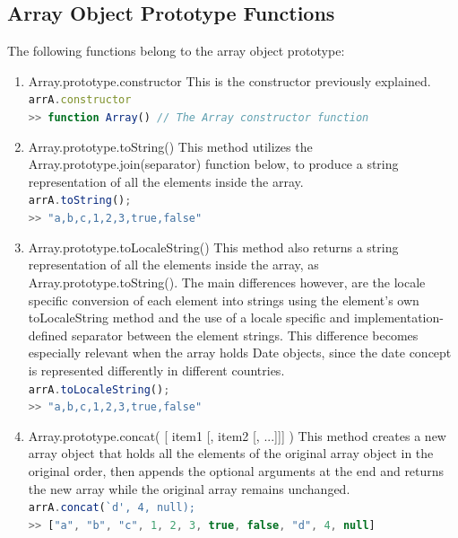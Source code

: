\documentclass[a4paper,11pt,twoside]{report}
\def\jsinline{\lstinline[language=JavaScript, basicstyle=\small]}%\end{lstlisting}
\begin{document}
\subsection{Array Object Prototype Functions}
The following functions belong to the array object prototype: 
\begin{enumerate}
\item Array.prototype.constructor \newline
This is the constructor previously explained.\\
\jsinline|arrA.constructor| \\
\jsinline|>> function Array() // The Array constructor function |

\item Array.prototype.toString() \newline
This method utilizes the Array.prototype.join(separator) function below, to produce a string representation of all the elements inside the array.\\
\jsinline|arrA.toString();|\\
\jsinline|>> "a,b,c,1,2,3,true,false"|

\item Array.prototype.toLocaleString() \newline
This method also returns a string representation of all the elements inside the array, as Array.prototype.toString(). The main differences however, are the locale specific conversion of each element into strings using the element's own toLocaleString method and the use of a locale specific and implementation-defined separator between the element strings. This difference becomes especially relevant when the array holds Date objects, since the date concept is represented differently in different countries.\\
\jsinline|arrA.toLocaleString();|\\
\jsinline|>> "a,b,c,1,2,3,true,false"|

\item Array.prototype.concat( [ item1 [, item2 [, ...]]] ) \newline
This method creates a new array object that holds all the elements of the original array object in the original order, then appends the optional arguments at the end and returns the new array while the original array remains unchanged.\\
\jsinline|arrA.concat(`d', 4, null);|\\
\jsinline|>> ["a", "b", "c", 1, 2, 3, true, false, "d", 4, null]|


\end{enumerate}
\end{document}
